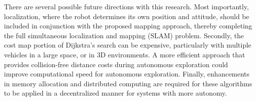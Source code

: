There are several possible future directions with this research. Most importantly, localization, where the robot determines its own position and attitude, should be included in conjunction with the proposed mapping approach, thereby completing the full simultaneous localization and mapping (SLAM) problem. Secondly, the cost map portion of Dijkstra's search can be expensive, particularly with multiple vehicles in a large space, or in 3D environments. A more efficient approach that provides collision-free distance costs during autonomous exploration could improve computational speed for autonomous exploration. Finally, enhancements in memory allocation and distributed computing are required for these algorithms to be applied in a decentralized manner for systems with more autonomy.
 


